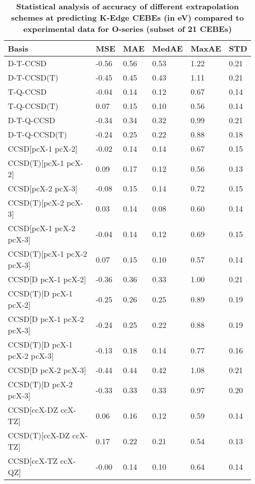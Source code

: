 \begin{table}
  \caption{\textbf{Statistical analysis of accuracy of different extrapolation schemes at predicting K-Edge CEBEs (in eV) compared to experimental data for O-series (subset of 21 CEBEs)}}
  \begin{tabular}{l l l l l l }
    \toprule
    \textbf{Basis} & \textbf{MSE} & \textbf{MAE} & \textbf{MedAE} & \textbf{MaxAE} & \textbf{STD} \\ 
    \midrule
    D-T-CCSD & -0.56 & 0.56 & 0.53 & 1.22 & 0.21 \\ 
    D-T-CCSD(T) & -0.45 & 0.45 & 0.43 & 1.11 & 0.21 \\ 
    T-Q-CCSD & -0.04 & 0.14 & 0.12 & 0.67 & 0.14 \\ 
    T-Q-CCSD(T) & 0.07 & 0.15 & 0.10 & 0.56 & 0.14 \\ 
    D-T-Q-CCSD & -0.34 & 0.34 & 0.32 & 0.99 & 0.21 \\ 
    D-T-Q-CCSD(T) & -0.24 & 0.25 & 0.22 & 0.88 & 0.18 \\ 
    CCSD[pcX-1 pcX-2] & -0.02 & 0.14 & 0.14 & 0.67 & 0.15 \\ 
    CCSD(T)[pcX-1 pcX-2] & 0.09 & 0.17 & 0.12 & 0.56 & 0.13 \\ 
    CCSD[pcX-2 pcX-3] & -0.08 & 0.15 & 0.14 & 0.72 & 0.15 \\ 
    CCSD(T)[pcX-2 pcX-3] & 0.03 & 0.14 & 0.08 & 0.60 & 0.14 \\ 
    CCSD[pcX-1 pcX-2 pcX-3] & -0.04 & 0.14 & 0.12 & 0.69 & 0.15 \\ 
    CCSD(T)[pcX-1 pcX-2 pcX-3] & 0.07 & 0.15 & 0.10 & 0.57 & 0.14 \\ 
    CCSD[D pcX-1 pcX-2] & -0.36 & 0.36 & 0.33 & 1.00 & 0.21 \\ 
    CCSD(T)[D pcX-1 pcX-2] & -0.25 & 0.26 & 0.25 & 0.89 & 0.19 \\ 
    CCSD[D pcX-1 pcX-2 pcX-3] & -0.24 & 0.25 & 0.22 & 0.88 & 0.19 \\ 
    CCSD(T)[D pcX-1 pcX-2 pcX-3] & -0.13 & 0.18 & 0.14 & 0.77 & 0.16 \\ 
    CCSD[D pcX-2 pcX-3] & -0.44 & 0.44 & 0.42 & 1.08 & 0.21 \\ 
    CCSD(T)[D pcX-2 pcX-3] & -0.33 & 0.33 & 0.33 & 0.97 & 0.20 \\ 
    CCSD[ccX-DZ ccX-TZ] & 0.06 & 0.16 & 0.12 & 0.59 & 0.14 \\ 
    CCSD(T)[ccX-DZ ccX-TZ] & 0.17 & 0.22 & 0.21 & 0.54 & 0.13 \\ 
    CCSD[ccX-TZ ccX-QZ] & -0.00 & 0.14 & 0.10 & 0.64 & 0.14 \\ 

\end{tabular}
\end{table}
